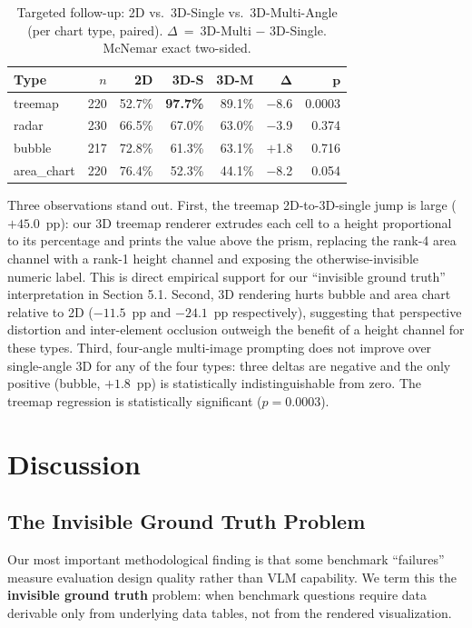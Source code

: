\documentclass[sigconf, 10pt]{acmart}
\begin{document}
\begin{table}[h]
\caption{Targeted follow-up: 2D vs.\ 3D-Single vs.\ 3D-Multi-Angle (per chart type, paired). $\Delta$~=~3D-Multi $-$ 3D-Single. McNemar exact two-sided.}
\label{tab:stage2}
\small
\begin{tabular}{lrrrrrr}
\toprule
\textbf{Type} & $n$ & \textbf{2D} & \textbf{3D-S} & \textbf{3D-M} & $\bm{\Delta}$ & $\bm{p}$ \\
\midrule
treemap     & 220 & 52.7\% & \textbf{97.7\%} & 89.1\% & $-$8.6 & 0.0003 \\
radar       & 230 & 66.5\% & 67.0\%          & 63.0\% & $-$3.9 & 0.374 \\
bubble      & 217 & 72.8\% & 61.3\%          & 63.1\% & $+$1.8 & 0.716 \\
area\_chart & 220 & 76.4\% & 52.3\%          & 44.1\% & $-$8.2 & 0.054 \\
\bottomrule
\end{tabular}
\end{table}

Three observations stand out. First, the treemap 2D-to-3D-single jump is large ($+45.0$~pp): our 3D treemap renderer extrudes each cell to a height proportional to its percentage and prints the value above the prism, replacing the rank-4 area channel with a rank-1 height channel and exposing the otherwise-invisible numeric label. This is direct empirical support for our ``invisible ground truth'' interpretation in Section 5.1. Second, 3D rendering hurts bubble and area chart relative to 2D ($-11.5$~pp and $-24.1$~pp respectively), suggesting that perspective distortion and inter-element occlusion outweigh the benefit of a height channel for these types. Third, four-angle multi-image prompting does not improve over single-angle 3D for any of the four types: three deltas are negative and the only positive (bubble, $+1.8$~pp) is statistically indistinguishable from zero. The treemap regression is statistically significant ($p{=}0.0003$).

\section{Discussion}

\subsection{The Invisible Ground Truth Problem}
Our most important methodological finding is that some benchmark ``failures'' measure evaluation design quality rather than VLM capability. We term this the \textbf{invisible ground truth} problem: when benchmark questions require data derivable only from underlying data tables, not from the rendered visualization.
\end{document}

